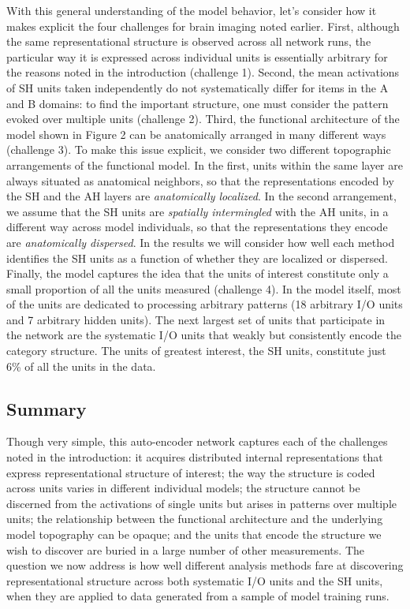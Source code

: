 With this general understanding of the model behavior, let's consider how it makes explicit the four challenges for brain imaging noted earlier. First, although the same representational structure is observed across all network runs, the particular way it is expressed across individual units is essentially arbitrary for the reasons noted in the introduction (challenge 1). Second, the mean activations of SH units taken independently do not systematically differ for items in the A and B domains: to find the important structure, one must consider the pattern evoked over multiple units (challenge 2). Third, the functional architecture of the model shown in Figure 2 can be anatomically arranged in many different ways (challenge 3). To make this issue explicit, we consider two different topographic arrangements of the functional model. In the first, units within the same layer are always situated as anatomical neighbors, so that the representations encoded by the SH and the AH layers are {\em anatomically localized}. In the second arrangement, we assume that the SH units are {\em spatially intermingled} with the AH units, in a different way across model individuals, so that the representations they encode are {\em anatomically dispersed}. In the results we will consider how well each method identifies the SH units as a function of whether they are localized or dispersed. Finally, the model captures the idea that the units of interest constitute only a small proportion of all the units measured (challenge 4). In the model itself, most of the units are dedicated to processing arbitrary patterns (18 arbitrary I/O units and 7 arbitrary hidden units). The next largest set of units that participate in the network are the systematic I/O units that weakly but consistently encode the category structure. The units of greatest interest, the SH units, constitute just 6\% of all the units in the data. 

\subsection{Summary} 

Though very simple, this auto-encoder network captures each of the challenges noted in the introduction: it acquires distributed internal representations that express representational structure of interest; the way the structure is coded across units varies in different individual models; the structure cannot be discerned from the activations of single units but arises in patterns over multiple units; the relationship between the functional architecture and the underlying model topography can be opaque; and the units that encode the structure we wish to discover are buried in a large number of other measurements. The question we now address is how well different analysis methods fare at discovering representational structure across both systematic I/O units and the SH units, when they are applied to data generated from a sample of model training runs.

